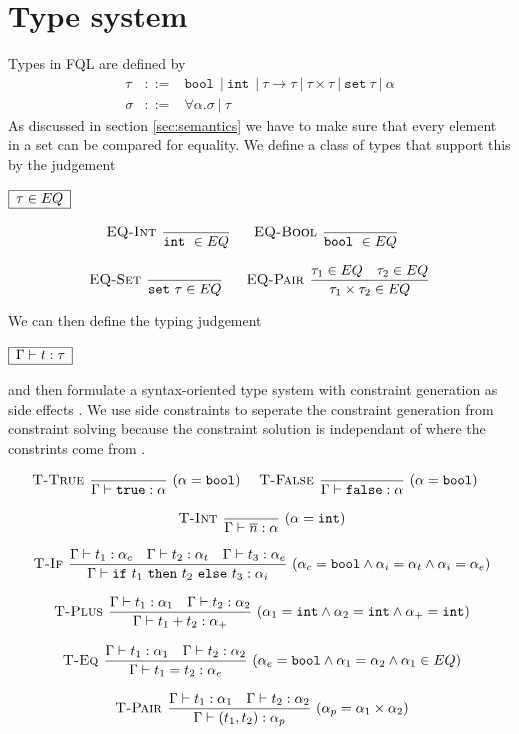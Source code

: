 \documentclass[a4paper]{article}
\newcommand{\pipe}{\ | \ }
\newcommand{\s}[1]{\mathtt{#1}}
\newcommand{\sn}{\overline{n}}
\newcommand{\sbool}{\s{bool\ }}
\newcommand{\sint}{\s{int\ }}
\newcommand{\sseta}{\s{set\ }}
\newcommand{\sif}{\s{if\ }}
\newcommand{\sthen}{\s{\ then\ }}
\newcommand{\selse}{\s{\ else\ }}
\newcommand{\strue}{\s{true}}
\newcommand{\sfalse}{\s{false}}
\renewcommand{\rule}[3][]{\ \mbox{\textsc{#1 }}\dfrac{#2}{#3}\ }
\newcommand{\smbox}[1]{
  $\begin{array}{|c|}
    \hline
    #1 \\
    \hline
  \end{array}$
}
\begin{document}
\section{Type system}
\label{sec:typeSystem}

Types in FQL are defined by
\begin{eqnarray*}
\tau &::=& \sbool \pipe \sint \pipe \tau \to \tau \pipe \tau \times \tau \pipe \sseta \tau \pipe \alpha\\
\sigma &::=& \forall \alpha. \sigma \pipe \tau
\end{eqnarray*}
As discussed in section \ref{sec:semantics} we have to make sure
that every element in a set can be compared for equality. We define
a class of types that support this by the judgement
\smbox{\tau \in EQ}
\[\begin{array}{c}
\rule[EQ-Int]{}{\sint \in EQ}\quad
\rule[EQ-Bool]{}{\sbool \in EQ}\quad\\\\
\rule[EQ-Set]{}{\sseta \tau \in EQ}\quad
\rule[EQ-Pair]{\tau_1 \in EQ \quad \tau_2 \in EQ}{\tau_1 \times \tau_2 \in EQ}
\end{array}\]

We can then define the typing judgement
\smbox{\Gamma \vdash t : \tau}
and then formulate a syntax-oriented type system with constraint generation as side effects \cite{Heeren02generalizinghindley-milner, Henglein89polymorphictype}. We use side constraints to seperate the constraint generation from constraint solving because the constraint solution is independant of where the constrints come from \cite{henglein94fund-type-inf-sys}.


\[\begin{array}{c}
\rule[T-True]{}{\Gamma \vdash \strue : \alpha}(\alpha = \s{bool})\quad
\rule[T-False]{}{\Gamma \vdash \sfalse : \alpha}(\alpha = \s{bool})\quad
\\\\
\rule[T-Int]{}{\Gamma \vdash \sn : \alpha}(\alpha = \s{int})
\\\\
\rule[T-If]{\Gamma\vdash t_1 : \alpha_c \quad \Gamma\vdash t_2 : \alpha_t \quad \Gamma\vdash t_3 : \alpha_e}
{\Gamma\vdash \sif t_1 \sthen t_2 \selse t_3 : \alpha_i}
(\alpha_c = \s{bool} \wedge \alpha_i = \alpha_t \wedge \alpha_i = \alpha_e)
\\\\
\rule[T-Plus]{\Gamma\vdash t_1 : \alpha_1
\quad \Gamma\vdash t_2 : \alpha_2}
{\Gamma\vdash t_1 + t_2 : \alpha_+}
(\alpha_1 = \s{int} \wedge \alpha_2 = \s{int} \wedge \alpha_+ = \s{int})
\\\\
\rule[T-Eq]{\Gamma\vdash t_1 : \alpha_1
\quad \Gamma\vdash t_2 : \alpha_2}
{\Gamma\vdash t_1 = t_2 : \alpha_e}
(\alpha_e = \s{bool} \wedge \alpha_1 = \alpha_2 \wedge \alpha_1 \in EQ)
\\\\
\rule[T-Pair]{\Gamma\vdash t_1 : \alpha_1
\quad \Gamma \vdash t_2 : \alpha_2}
{\Gamma \vdash (t_1, t_2) : \alpha_p}
(\alpha_p = \alpha_1 \times \alpha_2)
\end{array}\]
\end{document}
